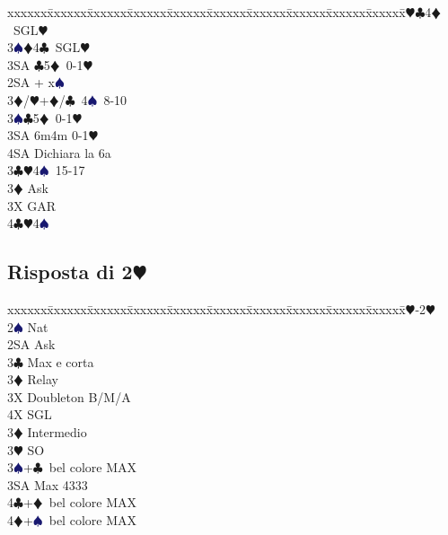 \documentclass[a4paper,italian]{article}
\newcommand{\BC}{\textcolor{OliveGreen}{$\clubsuit$}}
\newcommand{\BD}{\textcolor{RedOrange}{$\vardiamondsuit$}}
\newcommand{\BH}{\textcolor{Red2}{$\varheartsuit${}}}
\newcommand{\BS}{\textcolor{MidnightBlue}{$\spadesuit${}}}
\newcommand{\pdfh}{\texorpdfstring{\BH{}}{H}}
\newenvironment{bidtable}
{\begin{tabbing}

    xxxxxx\=xxxxxx\=xxxxxx\=xxxxxx\=xxxxxx\=xxxxxx\=xxxxxx\=xxxxxx\=xxxxxx\=xxxxxx\=\kill}
{\end{tabbing} }%
\begin{document}
\begin{multicols}{2}
\begin{bidtable}
                                            3\BH {}\BC 4\BD\ SGL\BH \\
                                            3\BS {}\BD 4\BC\ SGL\BH \\
                                            3SA \BC 5\BD\ 0-1\BH \-\\
                                            2SA + x\BS \+\\
                                            3\BD/\BH {}+\BD /\BC\ 4\BS\ 8-10\\
                                            3\BS {}\BC 5\BD\ 0-1\BH \\
                                            3SA \> 6m4m 0-1\BH \+\\
                                            4SA \> Dichiara la 6a\-\-\\
                                            3\BC {}\BH 4\BS\ 15-17\+\\
                                            3\BD \> Ask\+\\
                                            3X \> GAR\\
                                            4\BC {}\BH 4\BS \-\-\-\-\-
                                        \end{bidtable}
                                        \subsection{Risposta di 2\pdfh}
                                        \begin{bidtable}
                                            1\BH-2\BH\+\\
                                            2\BS \> Nat\\
                                            2SA \> Ask\+\\
                                            3\BC \> Max e corta\+\\
                                            3\BD \> Relay\+\\
                                            3X \> Doubleton B/M/A\\
                                            4X \> SGL\-\-\\
                                            3\BD \> Intermedio\\
                                            3\BH \> SO\\
                                            3\BS {}+\BC\ bel colore MAX\\
                                            3SA \> Max 4333\\
                                            4\BC {}+\BD\ bel colore MAX\\
                                            4\BD {}+\BS\ bel colore MAX\-\-
                                        \end{bidtable}
                                        \columnbreak

\end{multicols}
\end{document}
